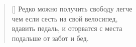 \documentclass[a5paper,11pt]{memoir}
\begin{document}
\BgThispage



\newpage

\PlainPoemTitle
{}
\settowidth{\versewidth}{ступеньки под весом скрипят и трещат ---}
\begin{verse}[\versewidth]
Редко можно получить свободу легче\\
чем если сесть на свой велосипед,\\
вдавить педаль, и оторватся с места\\
подальше от забот и бед.
\end{verse}
\end{document}
